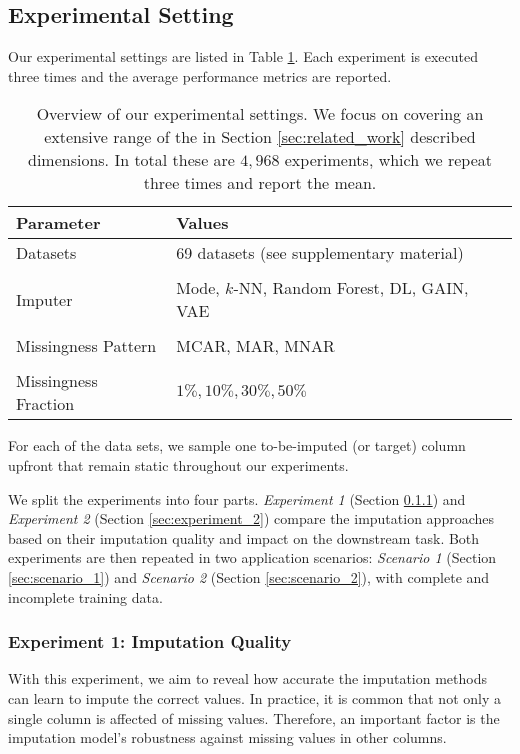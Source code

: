 \subsection{Experimental Setting}
%
Our experimental settings are listed in Table \ref{tab:experiment_settings}. Each experiment is executed three times and the average performance metrics are reported.
%
\begin{table}
	\centering
	\begin{tabular}{ll}
		\toprule
		Parameter            & Values                                     \\ \midrule
		Datasets             & 69 datasets (see supplementary material)    \\
		\\[-0.5em]
		Imputer              & Mode, $k$-NN, Random Forest, DL, GAIN, VAE \\
		\\[-0.5em]
		Missingness Pattern  & MCAR, MAR, MNAR                            \\
		\\[-0.5em]
		Missingness Fraction & $1\%, 10\%, 30\%, 50\%$                      \\ \bottomrule
	\end{tabular}
	\caption{Overview of our experimental settings. We focus on covering an extensive range of the in Section \ref{sec:related_work} described dimensions. In total these are $4,968$ experiments, which we repeat three times and report the mean.}
	\label{tab:experiment_settings}
\end{table}
%
For each of the data sets, we sample one to-be-imputed (or target) column upfront that remain static throughout our experiments.

We split the experiments into four parts. \emph{Experiment 1} (Section \ref{sec:experiment_1}) and \emph{Experiment 2} (Section \ref{sec:experiment_2}) compare the imputation approaches based on their imputation quality and impact on the downstream task. Both experiments are then repeated in two application scenarios: \emph{Scenario 1} (Section \ref{sec:scenario_1}) and \emph{Scenario 2} (Section \ref{sec:scenario_2}), with complete and incomplete training data.


\subsubsection{Experiment 1: Imputation Quality}
\label{sec:experiment_1}
%
With this experiment, we aim to reveal how accurate the imputation methods can learn to impute the correct values. In practice, it is common that not only a single column is affected of missing values. Therefore, an important factor is the imputation model's robustness against missing values in other columns.

